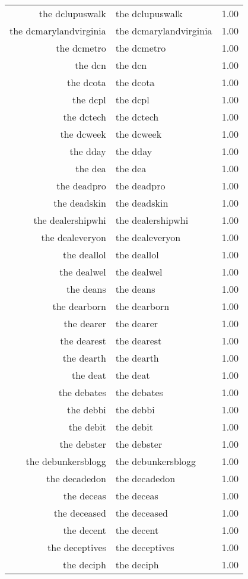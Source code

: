 \begin{table}[ht]
\begin{tabular}{rlr}
  the dclupuswalk & the dclupuswalk & 1.00 \\ 
  the dcmarylandvirginia & the dcmarylandvirginia & 1.00 \\ 
  the dcmetro & the dcmetro & 1.00 \\ 
  the dcn & the dcn & 1.00 \\ 
  the dcota & the dcota & 1.00 \\ 
  the dcpl & the dcpl & 1.00 \\ 
  the dctech & the dctech & 1.00 \\ 
  the dcweek & the dcweek & 1.00 \\ 
  the dday & the dday & 1.00 \\ 
  the dea & the dea & 1.00 \\ 
  the deadpro & the deadpro & 1.00 \\ 
  the deadskin & the deadskin & 1.00 \\ 
  the dealershipwhi & the dealershipwhi & 1.00 \\ 
  the dealeveryon & the dealeveryon & 1.00 \\ 
  the deallol & the deallol & 1.00 \\ 
  the dealwel & the dealwel & 1.00 \\ 
  the deans & the deans & 1.00 \\ 
  the dearborn & the dearborn & 1.00 \\ 
  the dearer & the dearer & 1.00 \\ 
  the dearest & the dearest & 1.00 \\ 
  the dearth & the dearth & 1.00 \\ 
  the deat & the deat & 1.00 \\ 
  the debates & the debates & 1.00 \\ 
  the debbi & the debbi & 1.00 \\ 
  the debit & the debit & 1.00 \\ 
  the debster & the debster & 1.00 \\ 
  the debunkersblogg & the debunkersblogg & 1.00 \\ 
  the decadedon & the decadedon & 1.00 \\ 
  the deceas & the deceas & 1.00 \\ 
  the deceased & the deceased & 1.00 \\ 
  the decent & the decent & 1.00 \\ 
  the deceptives & the deceptives & 1.00 \\ 
  the deciph & the deciph & 1.00 \\ 

\end{tabular}
\end{table}

